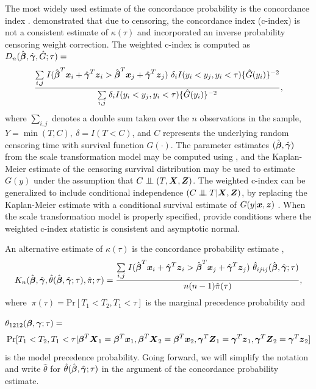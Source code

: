 \documentclass[12pt]{article}
\newcommand{\bmx}{\mbox{\boldmath $x$}}
\newcommand{\bmX}{\mbox{\boldmath $X$}}
\newcommand{\bg}{\mbox{\boldmath $\gamma$}}
\newcommand{\bb}{\mbox{\boldmath $\beta$}}
\newcommand{\bmZ}{\mbox{\boldmath $Z$}}
\newcommand{\bmz}{\mbox{\boldmath $z$}}
\newcommand{\CI}{\mathrel{\perp\mspace{-10mu}\perp}}
\def\stackunder#1#2{\mathrel{\mathop{#2}\limits_{#1}}}
\begin{document}
The most widely used estimate of the concordance probability is the concordance index \citep{Harrell1982, Harrell1996}. 
\cite{Uno2011} demonstrated that due to censoring, the concordance index (c-index) is not a consistent estimate of $\kappa(\tau)$ and incorporated an inverse probability censoring weight correction. The weighted c-index is computed as
\newline $D_n(\hat{\bb},\hat{\bg}, \hat{G}; \tau) = $
\begin{equation}  \frac{\stackunder{i, j }{\sum }  I(\hat{\bb}^T\bmx_{i} + \hat{\bg}^T\bmz_{i} > \hat{\bb}^T\bmx_j + \hat{\bg}^T\bmz_j) \ \delta_i I(y_i <y _j, y_i < \tau)   \{\hat{G}(y_i)\}^{-2}}
{\stackunder{i, j }{\sum } \delta_i I(y_i <y _j, y_i < \tau) \{\hat{G}(y_i)\}^{-2}} ,\end{equation}
\normalsize
where $\stackunder{i, j }{\sum }$ denotes a double sum taken over the $n$ observations in the sample, $Y = \min(T,C), \ \delta = I(T < C)$, and $C$ represents the underlying random censoring time with survival function $G(\cdot)$. The parameter estimates $(\hat{\bb},\hat{\bg})$ from the scale transformation model may be computed using \cite{Cheng1995}, and the Kaplan-Meier estimate of the censoring survival distribution may be used to estimate $G(y)$ under the assumption that $C \CI (T,\bmX, \bmZ)$. The weighted c-index can be generalized to include conditional independence $(C \CI T | \bmX, \bmZ)$, by replacing the Kaplan-Meier estimate with a conditional survival estimate of $G(y |\bmx, \bmz)$ \citep{Gerds2013,GerdsPEC}. When the scale transformation model is properly specified, \cite{Uno2011} provide conditions where the weighted c-index statistic is consistent and asymptotic normal.


 
An alternative estimate of $\kappa(\tau)$ is the concordance probability estimate \citep{Gonen2005, Zhang2018},
\begin{equation}  K_n(\hat{\bb},\hat{\bg},\hat{\theta}(\hat{\bb},\hat{\bg};\tau), \hat{\pi}; \tau) = \frac{  \stackunder{i, j }{\sum } I(\hat{\bb}^T\bmx_{i} + \hat{\bg}^T\bmz_{i} > \hat{\bb}^T\bmx_j + \hat{\bg}^T\bmz_j)  \ \hat{\theta}_{ijij}(\hat{\bb},\hat{\bg};\tau)}{ n(n-1) \hat{\pi}(\tau) } , \end{equation}
where $ \ \pi(\tau) = \mbox{Pr}[T_1 < T_2, T_1 < \tau]$ is the marginal precedence probability and 

\bigskip

\noindent $\theta_{1212}(\bb, \bg; \tau) = $ \small 
\begin{equation}  \mbox{Pr}[T_1 < T_2, T_1 < \tau | \bb^T\bmX_1=\bb^T\bmx_1, \bb^T\bmX_2=\bb^T\bmx_2,\bg^T\bmZ_1=\bg^T\bmz_1,\bg^T\bmZ_2=\bg^T\bmz_2] \end{equation} \normalsize
is the model precedence probability.  Going forward, we will simplify the notation and write $\hat{\theta}$ for $\hat{\theta}(\hat{\bb},\hat{\bg};\tau)$ in the argument of the concordance probability estimate.
\end{document}
